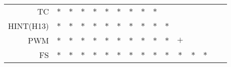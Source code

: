 \documentclass[landscape, 6pt]{report}
\begin{document}
\begin{table}[h!]
\begin{center}
\begin{tabular}{ rccccccccccccccc }
    TC & $*$ & $*$ & $*$ & $*$ & $*$ & $*$ & $*$ & $*$ & $*$ &     &     &     &     &     &     \\
    HINT(H13) & $*$ & $*$ & $*$ & $*$ & $*$ & $*$ & $*$ & $*$ & $*$ & $*$ &     &     &     &     &     \\
    PWM & $*$ & $*$ & $*$ & $*$ & $*$ & $*$ & $*$ & $*$ & $*$ & $*$ & $+$ &     &     &     &     \\
    FS & $*$ & $*$ & $*$ & $*$ & $*$ & $*$ & $*$ & $*$ & $*$ & $*$ & $*$ & $*$ & $*$ &     &     \\
    \hline
  \end{tabular}
\end{center}
\vspace{0.0cm}
\end{table}
\end{document}
